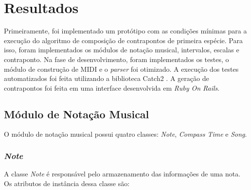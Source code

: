 \chapter[Resultados]{Resultados} \label{c3}

  Primeiramente, foi implementado um protótipo com as condições mínimas para a execução do algoritmo de composição de contrapontos de primeira espécie. Para isso, foram implementados os módulos de notação musical, intervalos, escalas e contraponto. Na fase de desenvolvimento, foram implementados os testes, o módulo de construção de MIDI e o \textit{parser} foi otimizado. A execução dos testes automatizados foi feita utilizando a biblioteca Catch2 \footnotemark {}. A geração de contrapontos foi feita em uma interface desenvolvida em \textit{Ruby On Rails}.

  \section[Módulo de Notação Musical]{Módulo de Notação Musical}

    O módulo de notação musical possui quatro classes: \textit{Note}, \textit{Compass Time} e \textit{Song}.

    \subsection[\textit{Note}]{\textit{Note}}

      A classe \textit{Note} é responsável pelo armazenamento das informações de uma nota. Os atributos de instância dessa classe são:

